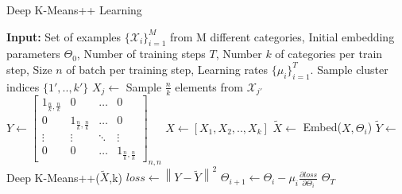\begin{algorithm}[H]
\caption{Deep K-Means++ Learning}
\begin{algorithmic}[1]
	\State \textbf{Input:} Set of examples $\{\mathcal{X}_i\}_{i=1}^{M}$ from M different categories, Initial embedding parameters $\Theta_0$, Number of training steps $T$, Number $k$ of categories per train step, Size $n$ of batch per training step, Learning rates $\{\mu_i\}_{i=1}^{T}$.
    	\State Sample cluster indices $\{1',..,k'\}$
        	\State $X_j\gets$ Sample $\frac{n}{k}$ elements from $\mathcal{X}_{j'}$
        \EndFor
        \State $Y\gets \begin{bmatrix}
    1_{\frac{n}{k},\frac{n}{k}} & 0 & \dots & 0 \\
    0 & 1_{\frac{n}{k},\frac{n}{k}} & \dots & 0\\
    \vdots & \vdots & \ddots & \vdots \\
    0 & 0 & \dots & 1_{\frac{n}{k},\frac{n}{k}}
	\end{bmatrix} _{n,n}$ 
        \State $X \gets [X_1,X_2,..,X_k]$ 
        \State $\widetilde{X} \leftarrow$ Embed($X,\Theta_i$) 
  		\State $\widetilde{Y} \leftarrow$ Deep K-Means++($\widetilde{X}$,k) 
        \State $loss \gets \left\lVert Y-\widetilde{Y} \right\rVert ^{2}$ 
        \State $\Theta_{i+1} \gets \Theta_i - \mu_i \frac{\partial loss}{\partial \Theta_i}$  %
    \EndFor
    \State \Return $\Theta_T$
\end{algorithmic}
\end{algorithm}
